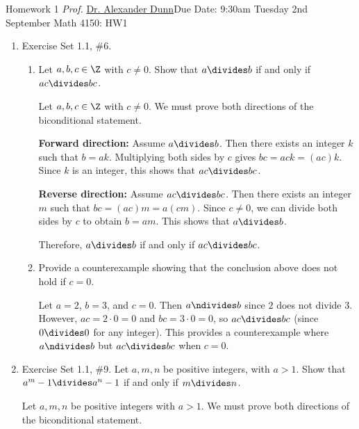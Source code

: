 \newpage{}
{Homework 1}
{\textit{Prof.} \href{https://alexjdunn.weebly.com/}{Dr. Alexander Dunn}}{Due Date: 9:30am Tuesday 2nd September}
{Math 4150: HW1}


\newpage


\begin{enumerate}
  \item Exercise Set 1.1, \#6.
  \begin{enumerate}
    \item Let $a,b, c\in \Z$ with $c\neq 0$. Show that $a\divides b$ if and only if $ac \divides bc$.
    \begin{subanswer}
      Let $a,b,c \in \Z$ with $c \neq 0$. We must prove both directions of the biconditional statement.
      
      \textbf{Forward direction:} Assume $a \divides b$. Then there exists an integer $k$ such that $b = ak$. Multiplying both sides by $c$ gives $bc = ack = (ac)k$. Since $k$ is an integer, this shows that $ac \divides bc$.
      
      \textbf{Reverse direction:} Assume $ac \divides bc$. Then there exists an integer $m$ such that $bc = (ac)m = a(cm)$. Since $c \neq 0$, we can divide both sides by $c$ to obtain $b = am$. This shows that $a \divides b$.
      
      Therefore, $a \divides b$ if and only if $ac \divides bc$.
    \end{subanswer}
    \item Provide a counterexample showing that the conclusion above does not hold if $c = 0$.
    \begin{subanswer}
      Let $a = 2$, $b = 3$, and $c = 0$. Then $a \ndivides b$ since $2$ does not divide $3$. However, $ac = 2 \cdot 0 = 0$ and $bc = 3 \cdot 0 = 0$, so $ac \divides bc$ (since $0 \divides 0$ for any integer). This provides a counterexample where $a \ndivides b$ but $ac \divides bc$ when $c = 0$.
    \end{subanswer}
  \end{enumerate}

  \newpage

  \item Exercise Set 1.1, \#9. Let $a, m, n$ be positive integers, with $a > 1$. Show that $a^{m}-1 \divides a^{n}-1$ if and only if $m\divides n$.
  \begin{subanswer}
    Let $a, m, n$ be positive integers with $a > 1$. We must prove both directions of the biconditional statement.
    

\end{subanswer}
\end{enumerate}
